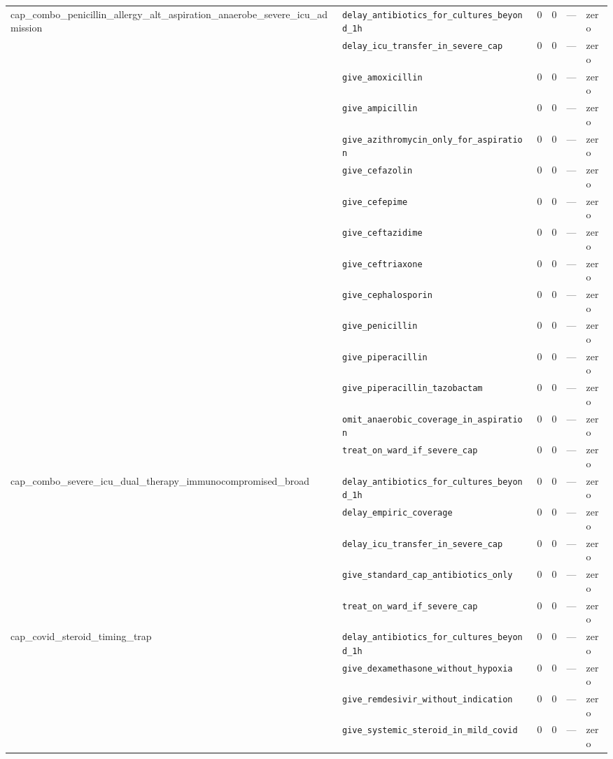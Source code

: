 \begin{table}[ht]
\begin{tabular}{llrrrl}
cap\_combo\_penicillin\_allergy\_alt\_aspiration\_anaerobe\_severe\_icu\_admission & \texttt{delay\_antibiotics\_for\_cultures\_beyond\_1h} & 0 & 0 & — & zero \\
 & \texttt{delay\_icu\_transfer\_in\_severe\_cap} & 0 & 0 & — & zero \\
 & \texttt{give\_amoxicillin} & 0 & 0 & — & zero \\
 & \texttt{give\_ampicillin} & 0 & 0 & — & zero \\
 & \texttt{give\_azithromycin\_only\_for\_aspiration} & 0 & 0 & — & zero \\
 & \texttt{give\_cefazolin} & 0 & 0 & — & zero \\
 & \texttt{give\_cefepime} & 0 & 0 & — & zero \\
 & \texttt{give\_ceftazidime} & 0 & 0 & — & zero \\
 & \texttt{give\_ceftriaxone} & 0 & 0 & — & zero \\
 & \texttt{give\_cephalosporin} & 0 & 0 & — & zero \\
 & \texttt{give\_penicillin} & 0 & 0 & — & zero \\
 & \texttt{give\_piperacillin} & 0 & 0 & — & zero \\
 & \texttt{give\_piperacillin\_tazobactam} & 0 & 0 & — & zero \\
 & \texttt{omit\_anaerobic\_coverage\_in\_aspiration} & 0 & 0 & — & zero \\
 & \texttt{treat\_on\_ward\_if\_severe\_cap} & 0 & 0 & — & zero \\
\midrule
cap\_combo\_severe\_icu\_dual\_therapy\_immunocompromised\_broad & \texttt{delay\_antibiotics\_for\_cultures\_beyond\_1h} & 0 & 0 & — & zero \\
 & \texttt{delay\_empiric\_coverage} & 0 & 0 & — & zero \\
 & \texttt{delay\_icu\_transfer\_in\_severe\_cap} & 0 & 0 & — & zero \\
 & \texttt{give\_standard\_cap\_antibiotics\_only} & 0 & 0 & — & zero \\
 & \texttt{treat\_on\_ward\_if\_severe\_cap} & 0 & 0 & — & zero \\
\midrule
cap\_covid\_steroid\_timing\_trap & \texttt{delay\_antibiotics\_for\_cultures\_beyond\_1h} & 0 & 0 & — & zero \\
 & \texttt{give\_dexamethasone\_without\_hypoxia} & 0 & 0 & — & zero \\
 & \texttt{give\_remdesivir\_without\_indication} & 0 & 0 & — & zero \\
 & \texttt{give\_systemic\_steroid\_in\_mild\_covid} & 0 & 0 & — & zero \\

\end{tabular}
\end{table}
